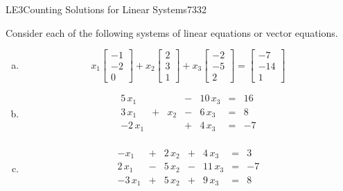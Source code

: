 \begin{exercise}{LE3}{Counting Solutions for Linear Systems}{7332} 
\begin{exerciseStatement} 

 Consider each of the following systems of linear equations or vector equations. 

 

\begin{enumerate}[(a)]
\item  

 \[
              x_{1} \left[\begin{array}{c}
-1 \\
-2 \\
0
\end{array}\right] + x_{2} \left[\begin{array}{c}
2 \\
3 \\
1
\end{array}\right] + x_{3} \left[\begin{array}{c}
-2 \\
-5 \\
2
\end{array}\right] = \left[\begin{array}{c}
-7 \\
-14 \\
1
\end{array}\right]
            \] 

 
\item  

 \[
              \begin{matrix}
 5 \, x_{1} &  &  &  -  & 10 \, x_{3} & = & 16 \\
 3 \, x_{1} &  +  & x_{2} &  -  & 6 \, x_{3} & = & 8 \\
 -2 \, x_{1} &  &  &  +  & 4 \, x_{3} & = & -7 \\
 \end{matrix}
            \] 

 
\item  

 \[
              \begin{matrix}
 -x_{1} &  +  & 2 \, x_{2} &  +  & 4 \, x_{3} & = & 3 \\
 2 \, x_{1} &  -  & 5 \, x_{2} &  -  & 11 \, x_{3} & = & -7 \\
 -3 \, x_{1} &  +  & 5 \, x_{2} &  +  & 9 \, x_{3} & = & 8 \\
 \end{matrix}
            \] 


\end{enumerate}
\end{exerciseStatement}
\end{exercise}
